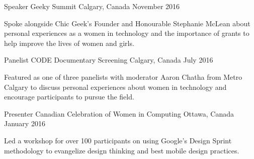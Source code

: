 \begin{cventries}
  \cventry
    {Speaker}
    {Geeky Summit}
    {Calgary, Canada}
    {November 2016}
    {
      \begin{cvitems}
        \item {Spoke alongside Chic Geek's Founder and Honourable Stephanie McLean about personal experiences as a women in technology and the importance of grants to help improve the lives of women and girls.}
      \end{cvitems}
    }
   \cventry
     {Panelist}
     {CODE Documentary Screening}
     {Calgary, Canada}
     {July 2016}
     {
       \begin{cvitems}
         \item {Featured as one of three panelists with moderator Aaron Chatha from Metro Calgary to discuss personal experiences about women in technology and encourage participants to pursue the field.}
       \end{cvitems}
     }
  \cventry
    {Presenter}
    {Canadian Celebration of Women in Computing}
    {Ottawa, Canada}
    {January 2016}
    {
      \begin{cvitems}
        \item {Led a workshop for over 100 participants on using Google's Design Sprint methodology to evangelize design thinking and best mobile design practices.}
      \end{cvitems}
    }   
    
\end{cventries}
